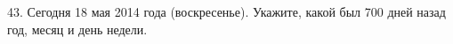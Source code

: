 43. Сегодня 18 мая 2014 года (воскресенье). Укажите, какой был 700 дней назад год, месяц и день недели.\\

